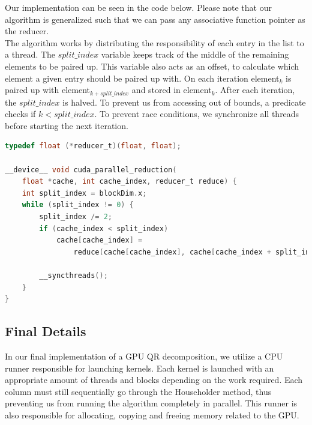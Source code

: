 Our implementation can be seen in the code below. Please note that our algorithm is generalized such that we can pass any associative function pointer as the reducer. \\
The algorithm works by distributing the responsibility of each entry in the list to a thread. The $split\_index$ variable keeps track of the middle of the remaining elements to be paired up. This variable also acts as an offset, to calculate which element a given entry should be paired up with. On each iteration element$_k$ is paired up with element$_{k + split\_index}$ and stored in element$_k$. After each iteration, the $split\_index$ is halved. To prevent us from accessing out of bounds, a predicate checks if $k < split\_index$. To prevent race conditions, we synchronize all threads before starting the next iteration. 

\begin{lstlisting}[language=C, caption={Parallel Reduction}, label={lst:parallel_reduce}]
typedef float (*reducer_t)(float, float);

__device__ void cuda_parallel_reduction(
    float *cache, int cache_index, reducer_t reduce) {
    int split_index = blockDim.x;
    while (split_index != 0) {
        split_index /= 2;
        if (cache_index < split_index)
            cache[cache_index] =
                reduce(cache[cache_index], cache[cache_index + split_index]);

        __syncthreads();
    }
}
\end{lstlisting}

\subsection*{Final Details}
In our final implementation of a GPU QR decomposition, we utilize a CPU runner responsible for launching kernels. Each kernel is launched with an appropriate amount of threads and blocks depending on the work required. Each column must still sequentially go through the Householder method, thus preventing us from running the algorithm completely in parallel. This runner is also responsible for allocating, copying and freeing memory related to the GPU. 